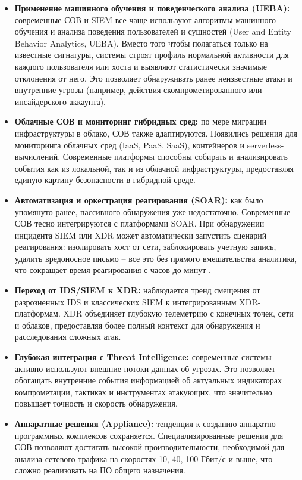 \begin{itemize}
    \item \textbf{Применение машинного обучения и поведенческого анализа (UEBA):} современные СОВ и SIEM все чаще используют алгоритмы машинного обучения и анализа поведения пользователей и сущностей (User and Entity Behavior Analytics, UEBA). Вместо того чтобы полагаться только на известные сигнатуры, системы строят профиль нормальной активности для каждого пользователя или хоста и выявляют статистически значимые отклонения от него. Это позволяет обнаруживать ранее неизвестные атаки и внутренние угрозы (например, действия скомпрометированного или инсайдерского аккаунта).
    \item \textbf{Облачные СОВ и мониторинг гибридных сред:} по мере миграции инфраструктуры в облако, СОВ также адаптируются. Появились решения для мониторинга облачных сред (IaaS, PaaS, SaaS), контейнеров и serverless-вычислений. Современные платформы способны собирать и анализировать события как из локальной, так и из облачной инфраструктуры, предоставляя единую картину безопасности в гибридной среде.
    \item \textbf{Автоматизация и оркестрация реагирования (SOAR):} как было упомянуто ранее, пассивного обнаружения уже недостаточно. Современные СОВ тесно интегрируются с платформами SOAR. При обнаружении инцидента SIEM или XDR может автоматически запустить сценарий реагирования: изолировать хост от сети, заблокировать учетную запись, удалить вредоносное письмо -- все это без прямого вмешательства аналитика, что сокращает время реагирования с часов до минут \cite{SIEMSec}.
    \item \textbf{Переход от IDS/SIEM к XDR:} наблюдается тренд смещения от разрозненных IDS и классических SIEM к интегрированным XDR-платформам. XDR объединяет глубокую телеметрию с конечных точек, сети и облаков, предоставляя более полный контекст для обнаружения и расследования сложных атак.
    \item \textbf{Глубокая интеграция с Threat Intelligence:} современные системы активно используют внешние потоки данных об угрозах. Это позволяет обогащать внутренние события информацией об актуальных индикаторах компрометации, тактиках и инструментах атакующих, что значительно повышает точность и скорость обнаружения.
    \item \textbf{Аппаратные решения (Appliance):} тенденция к созданию аппаратно-программных комплексов сохраняется. Специализированные решения для СОВ позволяют достигать высокой производительности, необходимой для анализа сетевого трафика на скоростях 10, 40, 100 Гбит/с и выше, что сложно реализовать на ПО общего назначения.
\end{itemize}


